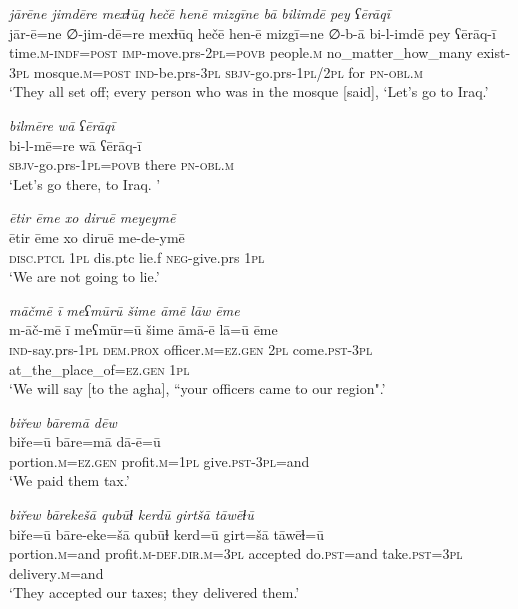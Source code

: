 \ea \label{BP.87}
\textit{jārēne jimdēre mexɫūq hečē henē mizgīne bā bilimdē pey ʕērāqī} \\ 
\gll jār-ē=ne ∅-jim-dē=re mexɫūq hečē hen-ē mizgī=ne ∅-b-ā bi-l-imdē pey ʕērāq-ī \\ 
 time\textsc{.m}\textsc{-indf}\textsc{=\textsc{post}} \textsc{imp-}move.prs-\textsc{2pl}\textsc{=\textsc{povb}} people\textsc{.m} no\_matter\_how\_many exist\textsc{-3pl} mosque\textsc{.m}\textsc{=\textsc{post}} \textsc{ind-}be.prs\textsc{-3pl} \textsc{sbjv-}go.prs\textsc{-\textsc{1pl}}/\textsc{2pl} for \textsc{pn}\textsc{-obl}\textsc{.m} \\ 
\glt `They all set off; every person who was in the mosque [said], ‘Let’s go to Iraq.'
\z 
 
\ea \label{BP.88}
\textit{bilmēre wā ʕērāqī} \\ 
\gll bi-l-mē=re wā ʕērāq-ī \\ 
 \textsc{sbjv-}go.prs\textsc{-\textsc{1pl}}\textsc{=\textsc{povb}} there \textsc{pn}\textsc{-obl}\textsc{.m} \\ 
\glt `Let’s go there, to Iraq. '
\z 
 
\ea \label{BP.89}
\textit{ētir ēme xo diruē meyeymē} \\ 
\gll ētir ēme xo diruē me-de-ymē \\ 
 \textsc{disc.ptcl} \textsc{1pl} dis.ptc lie.f \textsc{neg-}give.prs \textsc{1pl} \\ 
\glt `We are not going to lie.'
\z 
 
\ea \label{BP.90}
\textit{māčmē ī meʕmūrū šime āmē lāw ēme} \\ 
\gll m-āč-mē ī meʕmūr=ū šime āmā-ē lā=ū ēme \\ 
 \textsc{ind-}say.prs\textsc{-\textsc{1pl}} \textsc{dem.prox} officer\textsc{.m}\textsc{=ez.gen} \textsc{2pl} come\textsc{.pst}\textsc{-3pl} at\_the\_place\_of\textsc{=ez.gen} \textsc{1pl} \\ 
\glt `We will say [to the agha], “your officers came to our region".'
\z 
 
\ea \label{BP.91}
\textit{biřew bāremā dēw} \\ 
\gll biře=ū bāre=mā dā-ē=ū \\ 
 portion\textsc{.m}\textsc{=ez.gen} profit\textsc{.m}\textsc{=\textsc{1pl}} give\textsc{.pst}\textsc{-3pl}=and \\ 
\glt `We paid them tax.'
\z 
 
\ea \label{BP.92}
\textit{biřew bārekešā qubūɫ kerdū girtšā tāwēɫū} \\ 
\gll biře=ū bāre-eke=šā qubūɫ kerd=ū girt=šā tāwēɫ=ū \\ 
 portion\textsc{.m}=and profit\textsc{.m}\textsc{-def}\textsc{.dir}\textsc{.m}\textsc{=3pl} accepted do\textsc{.pst}=and take\textsc{.pst}\textsc{=3pl} delivery\textsc{.m}=and \\ 
\glt `They accepted our taxes; they delivered them.'
\z 
 
